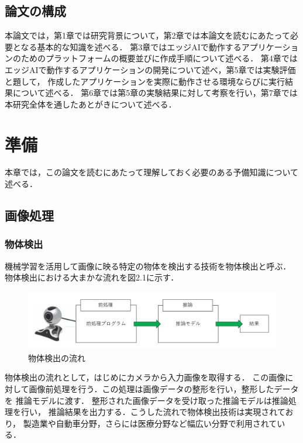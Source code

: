 \documentclass[11pt,a4j]{jreport}
\begin{document}
\section{論文の構成}
本論文では，第1章では研究背景について，第2章では本論文を読むにあたって必要となる基本的な知識を述べる．
第3章ではエッジAIで動作するアプリケーションのためのプラットフォームの概要並びに作成手順について述べる．
第4章ではエッジAIで動作するアプリケーションの開発について述べ，第5章では実験評価と題して，
作成したアプリケーションを実際に動作させる環境ならびに実行結果について述べる．
第6章では第5章の実験結果に対して考察を行い，第7章では本研究全体を通したあとがきについて述べる．

%
\chapter{準備}
本章では，この論文を読むにあたって理解しておく必要のある予備知識について述べる．
\section{画像処理}
\subsection{物体検出}
機械学習を活用して画像に映る特定の物体を検出する技術を物体検出\cite{BK}と呼ぶ．
物体検出における大まかな流れを図2.1に示す．
\begin{figure}[H]
  \center
  \includegraphics[scale = 0.8]{pict/pict4.jpg}
  \caption{物体検出の流れ}
\end{figure}
物体検出の流れとして，はじめにカメラから入力画像を取得する．
この画像に対して画像前処理を行う．この処理は画像データの整形を行い，整形したデータを
推論モデルに渡す．
整形された画像データを受け取った推論モデルは推論処理を行い，
推論結果を出力する．こうした流れで物体検出技術は実現されており，
製造業や自動車分野，さらには医療分野など幅広い分野で利用されている．
\end{document}
